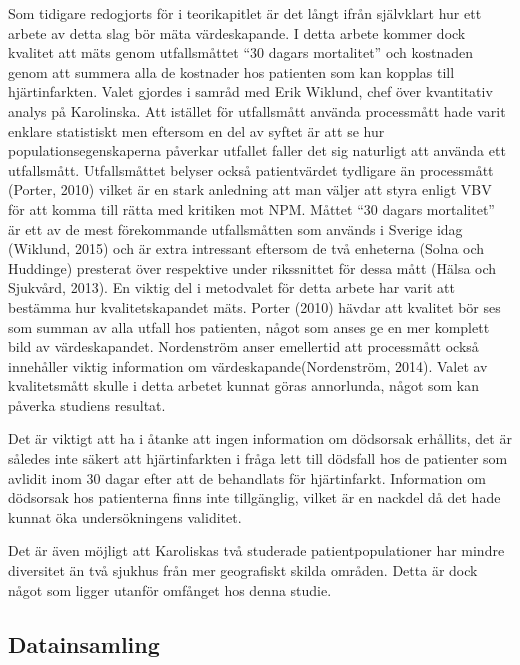 Som tidigare redogjorts för i teorikapitlet är det långt ifrån självklart hur ett arbete av detta slag bör mäta värdeskapande. I detta arbete kommer dock kvalitet att mäts genom utfallsmåttet “30 dagars mortalitet” och kostnaden genom att summera alla de kostnader hos patienten som kan kopplas till hjärtinfarkten. Valet gjordes i samråd med Erik Wiklund, chef över kvantitativ analys på Karolinska. Att istället för utfallsmått använda processmått hade varit enklare statistiskt men eftersom en del av syftet är att se hur populationsegenskaperna påverkar utfallet faller det sig naturligt att använda ett utfallsmått. Utfallsmåttet belyser också patientvärdet tydligare än processmått (Porter, 2010) vilket är en stark anledning att man väljer att styra enligt VBV för att komma till rätta med kritiken mot NPM. Måttet ``30 dagars mortalitet'' är ett av de mest förekommande utfallsmåtten som används i Sverige idag (Wiklund, 2015) och är extra intressant eftersom de två enheterna (Solna och Huddinge) presterat över respektive under rikssnittet för dessa mått (Hälsa och Sjukvård, 2013). En viktig del i metodvalet för detta arbete har varit att bestämma hur kvalitetskapandet mäts. Porter (2010) hävdar att kvalitet bör ses som summan av alla utfall hos patienten, något som anses ge en mer komplett bild av värdeskapandet. Nordenström anser emellertid att processmått också innehåller viktig information om värdeskapande(Nordenström, 2014). Valet av kvalitetsmått skulle i detta arbetet kunnat göras annorlunda, något som kan påverka studiens resultat.

Det är viktigt att ha i åtanke att ingen information om dödsorsak erhållits, det är således inte säkert att hjärtinfarkten i fråga lett till dödsfall hos de patienter som avlidit inom 30 dagar efter att de behandlats för hjärtinfarkt. Information om dödsorsak hos patienterna finns inte tillgänglig, vilket är en nackdel då det hade kunnat öka undersökningens validitet.

Det är även möjligt att Karoliskas två studerade patientpopulationer har mindre diversitet än två sjukhus från mer geografiskt skilda områden. Detta är dock något som ligger utanför omfånget hos denna studie.

\subsection{Datainsamling}

